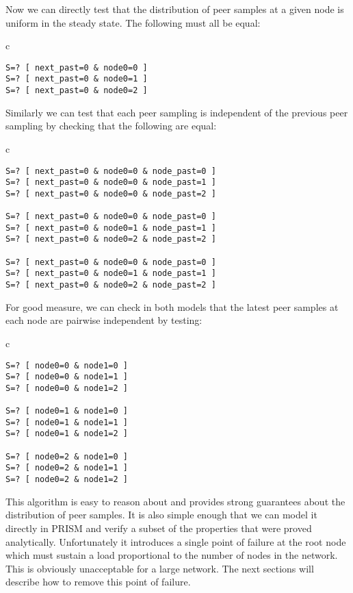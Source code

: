 \documentclass[a4paper,10pt]{article}
\newenvironment{prismprop}[0]{
  \begin{center}
  \begin{tabular}{c}
  \footnotesize
}{
  \end{tabular}
  \end{center}
}
\begin{document}
Now we can directly test that the distribution of peer samples at a given node is uniform in the steady state. The following must all be equal:

\begin{prismprop}
\begin{lstlisting}
S=? [ next_past=0 & node0=0 ]
S=? [ next_past=0 & node0=1 ]
S=? [ next_past=0 & node0=2 ]
\end{lstlisting}
\end{prismprop}

Similarly we can test that each peer sampling is independent of the previous peer sampling by checking that the following are equal:

\begin{prismprop}
\begin{lstlisting}
S=? [ next_past=0 & node0=0 & node_past=0 ]
S=? [ next_past=0 & node0=0 & node_past=1 ]
S=? [ next_past=0 & node0=0 & node_past=2 ]

S=? [ next_past=0 & node0=0 & node_past=0 ]
S=? [ next_past=0 & node0=1 & node_past=1 ]
S=? [ next_past=0 & node0=2 & node_past=2 ]

S=? [ next_past=0 & node0=0 & node_past=0 ]
S=? [ next_past=0 & node0=1 & node_past=1 ]
S=? [ next_past=0 & node0=2 & node_past=2 ]
\end{lstlisting}
\end{prismprop}

For good measure, we can check in both models that the latest peer samples at each node are pairwise independent by testing:

\begin{prismprop}
\begin{lstlisting}
S=? [ node0=0 & node1=0 ]
S=? [ node0=0 & node1=1 ]
S=? [ node0=0 & node1=2 ]

S=? [ node0=1 & node1=0 ]
S=? [ node0=1 & node1=1 ]
S=? [ node0=1 & node1=2 ]

S=? [ node0=2 & node1=0 ]
S=? [ node0=2 & node1=1 ]
S=? [ node0=2 & node1=2 ]
\end{lstlisting}
\end{prismprop}

This algorithm is easy to reason about and provides strong guarantees about the distribution of peer samples. It is also simple enough that we can model it directly in PRISM and verify a subset of the properties that were proved analytically. Unfortunately it introduces a single point of failure at the root node which must sustain a load proportional to the number of nodes in the network. This is obviously unacceptable for a large network. The next sections will describe how to remove this point of failure.
\end{document}
